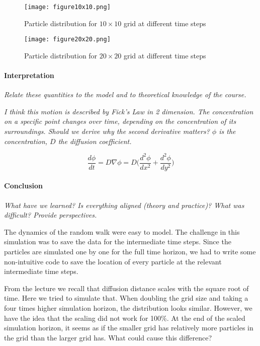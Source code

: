 \begin{figure}[htb]
    \label{fig:RandomWalk10}
	\centering
	\texttt{[image: figure10x10.png]}       
	\caption{Particle distribution for $10 \times 10$ grid at different time steps}
\end{figure}

\begin{figure}[htb]
    \label{fig:RandomWalk20}
	\centering
	\texttt{[image: figure20x20.png]}       
	\caption{Particle distribution for $20 \times 20$ grid at different time steps}
\end{figure}


 
\paragraph{Interpretation}
{\it Relate these quantities to the model and to theoretical knowledge of the course.}\newline

{\it I think this motion is described by Fick's Law in 2 dimension. The concentration on a specific point changes over time, depending on the concentration of its surroundings. Should we derive why the second derivative matters? $\phi$ is the concentration, $D$ the diffusion coefficient.}

\begin{equation}
\label{eq:FicksLaw}
\frac{d\phi}{dt} = D\nabla\phi = D \big(\frac{d^2\phi}{dx^2} + \frac{d^2\phi}{dy^2}\big)
\end{equation}


 \paragraph{Conclusion}
 \textit{What have we learned? Is everything aligned (theory and practice)? What was difficult? Provide perspectives.}
 
 The dynamics of the random walk were easy to model. The challenge in this simulation was to save the data for the intermediate time steps. Since the particles are simulated one by one for the full time horizon, we had to write some non-intuitive code to save the location of every particle at the relevant intermediate time steps. \newline
 
 From the lecture we recall that diffusion distance scales with the square root of time. Here we tried to simulate that. When doubling the grid size and taking a four times higher simulation horizon, the distribution looks similar. However, we have the idea that the scaling did not work for 100\%. At the end of the scaled simulation horizon, it seems as if the smaller grid has relatively more particles in the grid than the larger grid has. What could cause this difference?
 

